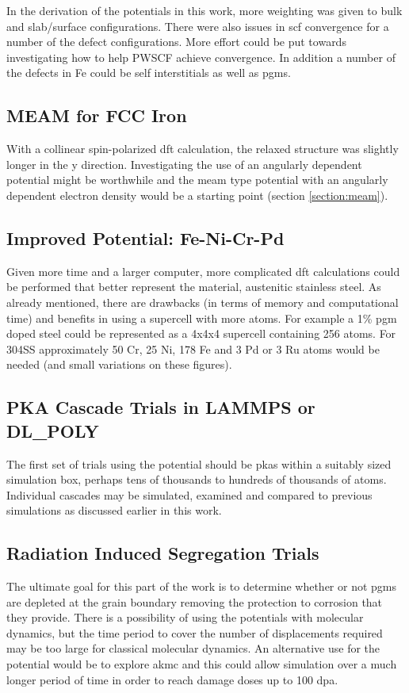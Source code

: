 In the derivation of the potentials in this work, more weighting was given to bulk and slab/surface configurations.  There were also issues in \acrshort{scf} convergence for a number of the defect configurations.  More effort could be put towards investigating how to help PWSCF achieve convergence.  In addition a number of the defects in Fe could be self interstitials as well as \acrshort{pgm}s.

\subsection{MEAM for FCC Iron}

With a collinear spin-polarized \acrshort{dft} calculation, the relaxed structure was slightly longer in the y direction.  Investigating the use of an angularly dependent potential might be worthwhile and the \acrshort{meam} type potential with an angularly dependent electron density would be a starting point (section \ref{section:meam}).

\subsection{Improved Potential: Fe-Ni-Cr-Pd}

Given more time and a larger computer, more complicated \acrshort{dft} calculations could be performed that better represent the material, austenitic stainless steel.  As already mentioned, there are drawbacks (in terms of memory and computational time) and benefits in using a supercell with more atoms.  For example a 1\% \acrshort{pgm} doped steel could be represented as a 4x4x4 supercell containing 256 atoms.  For \gls{304SS} approximately 50 Cr, 25 Ni, 178 Fe and 3 Pd or 3 Ru atoms would be needed (and small variations on these figures).

\subsection{PKA Cascade Trials in LAMMPS or DL\_POLY}

The first set of trials using the potential should be \acrshort{pka}s within a suitably sized simulation box, perhaps tens of thousands to hundreds of thousands of atoms.  Individual cascades may be simulated, examined and compared to previous simulations as discussed earlier in this work.
 

\subsection{Radiation Induced Segregation Trials}

The ultimate goal for this part of the work is to determine whether or not \acrshort{pgm}s are depleted at the grain boundary removing the protection to corrosion that they provide.  There is a possibility of using the potentials with molecular dynamics, but the time period to cover the number of displacements required may be too large for classical molecular dynamics.  An alternative use for the potential would be to explore \acrfull{akmc} and this could allow simulation over a much longer period of time in order to reach damage doses up to 100 \acrshort{dpa}.



